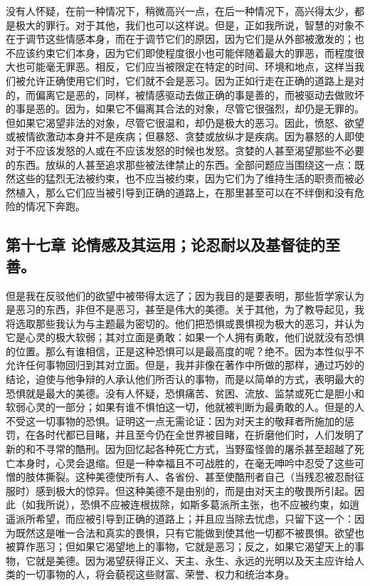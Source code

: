 没有人怀疑，在前一种情况下，稍微高兴一点，在后一种情况下，高兴得太少，都是极大的罪行。对于其他，我们也可以这样说。但是，正如我所说，智慧的对象不在于调节这些情感本身，而在于调节它们的原因，因为它们是从外部被激发的；也不应该约束它们本身，因为它们即使程度很小也可能伴随着最大的罪恶，而程度很大也可能毫无罪恶。相反，它们应当被限定在特定的时间、环境和地点，这样当我们被允许正确使用它们时，它们就不会是恶习。因为正如行走在正确的道路上是对的，而偏离它是恶的，同样，被情感驱动去做正确的事是善的，而被驱动去做败坏的事是恶的。因为，如果它不偏离其合法的对象，尽管它很强烈，却仍是无罪的。但如果它渴望非法的对象，尽管它很温和，却仍是极大的恶习。因此，愤怒、欲望或被情欲激动本身并不是疾病；但暴怒、贪婪或放纵才是疾病。因为暴怒的人即使对于不应该发怒的人或在不应该发怒的时候也发怒。贪婪的人甚至渴望那些不必要的东西。放纵的人甚至追求那些被法律禁止的东西。全部问题应当围绕这一点：既然这些的猛烈无法被约束，也不应当被约束，因为它们为了维持生活的职责而被必然植入，那么它们应当被引导到正确的道路上，在那里甚至可以在不绊倒和没有危险的情况下奔跑。\par


\subsection{第十七章 论情感及其运用；论忍耐以及基督徒的至善。}

但是我在反驳他们的欲望中被带得太远了；因为我目的是要表明，那些哲学家认为是恶习的东西，非但不是恶习，甚至是伟大的美德。关于其他，为了教导起见，我将选取那些我认为与主题最为密切的。他们把恐惧或畏惧视为极大的恶习，并认为它是心灵的极大软弱；其对立面是勇敢：如果一个人拥有勇敢，他们说就没有恐惧的位置。那么有谁相信，正是这种恐惧可以是最高度的呢？绝不。因为本性似乎不允许任何事物回归到其对立面。但是，我并非像在著作中所做的那样，通过巧妙的结论，迫使与他争辩的人承认他们所否认的事物，而是以简单的方式，表明最大的恐惧就是最大的美德。没有人怀疑，恐惧痛苦、贫困、流放、监禁或死亡是胆小和软弱心灵的一部分；如果有谁不惧怕这一切，他就被判断为最勇敢的人。但是的人不受这一切事物的恐惧。证明这一点无需论证：因为对天主的敬拜者所施加的惩罚，在各时代都已目睹，并且至今仍在全世界被目睹，在折磨他们时，人们发明了新的和不寻常的酷刑。因为回忆起各种死亡方式，当野蛮怪兽的屠杀甚至超越了死亡本身时，心灵会退缩。但是一种幸福且不可战胜的，在毫无呻吟中忍受了这些可憎的肢体撕裂。这种美德使所有人、各省份、甚至使酷刑者自己（当残忍被忍耐征服时）感到极大的惊异。但这种美德不是由别的，而是由对天主的敬畏所引起。因此（如我所说），恐惧不应被连根拔除，如斯多葛派所主张，也不应被约束，如逍遥派所希望，而应被引导到正确的道路上；并且应当除去忧虑，只留下这一个：因为既然这是唯一合法和真实的畏惧，只有它能做到使其他一切都不被畏惧。欲望也被算作恶习；但如果它渴望地上的事物，它就是恶习；反之，如果它渴望天上的事物，它就是美德。因为渴望获得正义、天主、永生、永远的光明以及天主应许给人类的一切事物的人，将会藐视这些财富、荣誉、权力和统治本身。\par

